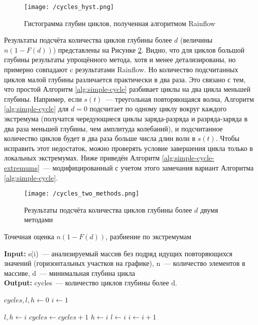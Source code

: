 \begin{figure}[h]
\texttt{[image: /cycles\_hyst.png]}
\caption{Гистограмма глубин циклов, полученная алгоритмом Rainflow}
\centering
\label{fig:cycles-hyst}
\end{figure}

Результаты подсчёта количества циклов глубины более $d$ (величины $n(1 - F(d))$) представлены на Рисунке \ref{fig:cycles-two-methods}.
Видно, что для циклов большой глубины результаты упрощённого метода, хотя и менее детализированы, но примерно совпадают c результатами Rainflow.
Но количество подсчитанных циклов малой глубины различается практически в два раза.
Это связано с тем, что простой Алгоритм \ref{alg:simple-cycle} разбивает циклы на два цикла меньшей глубины.
Например, если $s(t)$~--- треугольная повторяющаяся волна, Алгоритм \ref{alg:simple-cycle} для $d=0$ подсчитает по одному циклу вокруг каждого экстремума (получатся чередующиеся циклы заряда-разряда и разряда-заряда в два раза меньшей глубины, чем амплитуда колебаний), и подсчитанное количество циклов будет в два раза больше числа длин волн в $s(t)$.
Чтобы исправить этот недостаток, можно проверять условие завершения цикла только в локальных экстремумах.
Ниже приведён Алгоритм \ref{alg:simple-cycle-extremums}~--- модифицированный с учетом этого замечания вариант Алгоритма \ref{alg:simple-cycle}.



\begin{figure}[h]
\texttt{[image: /cycles\_two\_methods.png]}
\caption{Результаты подсчёта количества циклов глубины более $d$ двумя методами}
\centering
\label{fig:cycles-two-methods}
\end{figure}


\begin{algorithm}
\caption{Точечная оценка $n(1 - F(d))$, разбиение по экстремумам} \label{alg:simple-cycle-extremums}
\hspace*{\algorithmicindent} \textbf{Input:} s(i)~--- анализируемый массив без подряд идущих повторяющихся значений (горизонтальных участков на графике), n~--- количество элементов в массиве, d~--- минимальная глубина цикла \\
\hspace*{\algorithmicindent} \textbf{Output:} cycles~--- количество циклов глубины более d.

\begin{algorithmic}[1]
\State $cycles, l, h \gets 0$
\State $i \gets 1$


        \State $l,h \gets i$
        \State $cycles \gets cycles +1$
    \Else
            \State $h \gets i$
        \EndIf
            \State $l \gets i$
        \EndIf
    \EndIf
\EndIf
\State $i \gets i+1$
\EndWhile
 
\end{algorithmic}
\end{algorithm}

